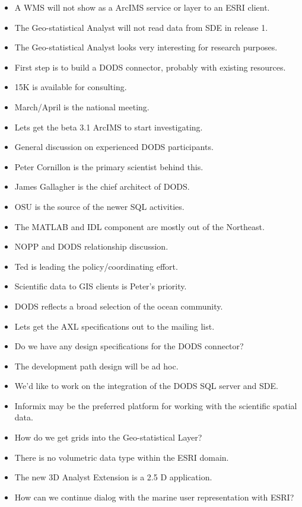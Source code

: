 \begin{itemize}
\item A WMS will not show as a ArcIMS service or layer to an ESRI client.
\item The Geo-statistical Analyst will not read data from SDE in release 1.
\item The Geo-statistical Analyst looks very interesting for research purposes.
\item First step is to build a DODS connector, probably with existing resources.
\item 15K is available for consulting.
\item March/April is the national meeting.
\item Lets get the beta 3.1 ArcIMS to start investigating.
\item General discussion on experienced DODS participants.
\item Peter Cornillon is the primary scientist behind this.
\item James Gallagher is the chief architect of DODS.
\item OSU is the source of the newer SQL activities.
\item The MATLAB and IDL component are mostly out of the Northeast.
\item NOPP and DODS relationship discussion.
\item Ted is leading the policy/coordinating effort.
\item Scientific data to GIS clients is Peter's priority.
\item DODS reflects a broad selection of the ocean community.
\item Lets get the AXL specifications out to the mailing list.
\item Do we have any design specifications for the DODS connector?
\item The development path design will be ad hoc.
\item We'd like to work on the integration of the DODS SQL server and SDE.
\item Informix may be the preferred platform for working with the scientific spatial data.
\item How do we get grids into the Geo-statistical Layer?
\item There is no volumetric data type within the ESRI domain.
\item The new 3D Analyst Extension is a 2.5 D application.
\item How can we continue dialog with the marine user representation with ESRI?

\end{itemize}
